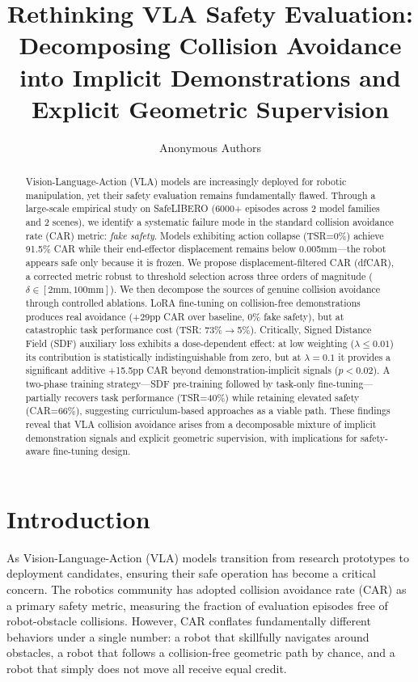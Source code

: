 \documentclass[letterpaper]{article}
\title{Rethinking VLA Safety Evaluation: Decomposing Collision Avoidance\\into Implicit Demonstrations and Explicit Geometric Supervision}
\author[1]{Anonymous Authors}
\affil[1]{Anonymous Institution}
\date{}
\begin{document}
\maketitle

\begin{abstract}
Vision-Language-Action (VLA) models are increasingly deployed for robotic manipulation, yet their safety evaluation remains fundamentally flawed. Through a large-scale empirical study on SafeLIBERO (6000+ episodes across 2 model families and 2 scenes), we identify a systematic failure mode in the standard collision avoidance rate (CAR) metric: \emph{fake safety}. Models exhibiting action collapse (TSR=0\%) achieve 91.5\% CAR while their end-effector displacement remains below 0.005mm---the robot appears safe only because it is frozen. We propose displacement-filtered CAR (dfCAR), a corrected metric robust to threshold selection across three orders of magnitude ($\delta \in [2\text{mm}, 100\text{mm}]$). We then decompose the sources of genuine collision avoidance through controlled ablations. LoRA fine-tuning on collision-free demonstrations produces real avoidance (+29pp CAR over baseline, 0\% fake safety), but at catastrophic task performance cost (TSR: 73\%$\to$5\%). Critically, Signed Distance Field (SDF) auxiliary loss exhibits a dose-dependent effect: at low weighting ($\lambda \leq 0.01$) its contribution is statistically indistinguishable from zero, but at $\lambda=0.1$ it provides a significant additive +15.5pp CAR beyond demonstration-implicit signals ($p<0.02$). A two-phase training strategy---SDF pre-training followed by task-only fine-tuning---partially recovers task performance (TSR=40\%) while retaining elevated safety (CAR=66\%), suggesting curriculum-based approaches as a viable path. These findings reveal that VLA collision avoidance arises from a decomposable mixture of implicit demonstration signals and explicit geometric supervision, with implications for safety-aware fine-tuning design.
\end{abstract}

\section{Introduction}

As Vision-Language-Action (VLA) models transition from research prototypes to deployment candidates, ensuring their safe operation has become a critical concern. The robotics community has adopted collision avoidance rate (CAR) as a primary safety metric, measuring the fraction of evaluation episodes free of robot-obstacle collisions. However, CAR conflates fundamentally different behaviors under a single number: a robot that skillfully navigates around obstacles, a robot that follows a collision-free geometric path by chance, and a robot that simply does not move all receive equal credit.
\end{document}
